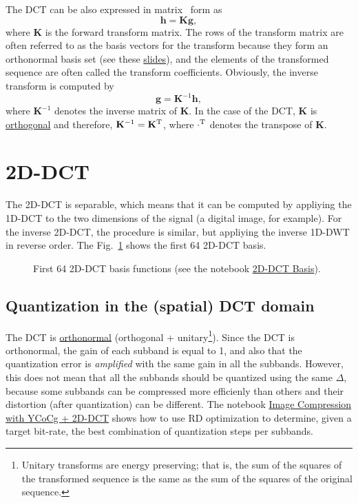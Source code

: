 The DCT can be also expressed in matrix~\cite{sayood2017introduction}
form as
\begin{equation}
  {\mathbf h} = {\mathbf K}{\mathbf g},
\end{equation}
where ${\mathbf K}$ is the forward transform matrix. The rows of the
transform matrix are often referred to as the basis vectors for the
transform because they form an orthonormal basis set (see these
\href{https://cseweb.ucsd.edu/classes/fa17/cse166-a/lec13.pdf}{slides}),
and the elements of the transformed sequence are often called the
transform coefficients. Obviously, the inverse transform is computed
by
\begin{equation}
  {\mathbf g} = {\mathbf K}^{-1}{\mathbf h},
\end{equation}
where ${\mathbf K}^{-1}$ denotes the inverse matrix of ${\mathbf
  K}$. In the case of the DCT, ${\mathbf K}$ is
\href{https://en.wikipedia.org/wiki/Orthogonal_matrix}{orthogonal} and
therefore, ${\mathbf K}^{-1}={\mathbf K}^{\text T}$, where
$\cdot^{\text T}$ denotes the transpose of ${\mathbf K}$.

\section{2D-DCT}

The 2D-DCT is separable, which means that it can be computed by
appliying the 1D-DCT to the two dimensions of the signal (a digital
image, for example). For the inverse 2D-DCT, the procedure is similar,
but appliying the inverse 1D-DWT in reverse order. The
Fig.~\ref{fig:2D-DCT_basis} shows the first 64 2D-DCT basis.

\begin{figure}
  \centering {} \caption{First 64 2D-DCT basis
  functions (see the notebook
\href{https://github.com/vicente-gonzalez-ruiz/DCT/blob/master/docs/HTML/graphics/2D-DCT_basis.ipynb}{2D-DCT Basis}).}
  \label{fig:2D-DCT_basis}
\end{figure}

\subsection{Quantization in the (spatial) DCT domain}

The DCT is
\href{https://en.wikipedia.org/wiki/Orthonormality}{orthonormal}
(orthogonal + unitary\footnote{Unitary transforms are energy
preserving; that is, the sum of the squares of the transformed
sequence is the same as the sum of the squares of the original
sequence.}). Since the DCT is orthonormal, the gain of each subband is
equal to 1, and also that the quantization error is \emph{amplified}
with the same gain in all the subbands. However, this does not mean
that all the subbands should be quantized using the same $\Delta$,
because some subbands can be compressed more efficienly than others
and their distortion (after quantization) can be different. The
notebook
\href{https://github.com/vicente-gonzalez-ruiz/DCT/blob/master/docs/notebooks/YCoCg_2D_DCT_SQ.ipynb}{Image
  Compression with YCoCg + 2D-DCT} shows how to use RD optimization to
determine, given a target bit-rate, the best combination of
quantization steps per subbands.

